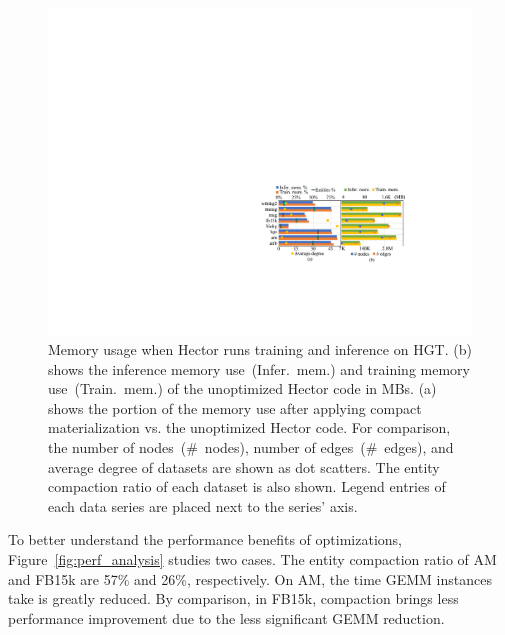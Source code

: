\begin{figure}[!htbp]
\centering
\includegraphics[width=\linewidth]{figures/Hector/DRAMAnalysis_v2.3.pdf}
\caption{\label{fig:dram_analysis} Memory usage when Hector runs training and inference on HGT. (b) shows the inference memory use~(Infer.\ mem.) and training memory use~(Train.\ mem.) of the unoptimized Hector code in MBs. (a) shows the portion of the memory use after applying compact materialization vs. the unoptimized Hector code. For comparison, the number of nodes~(\#\ nodes), number of edges~(\#\ edges), and average degree of datasets are shown as dot scatters. The entity compaction ratio of each dataset is also shown. Legend entries of each data series are placed next to the series' axis.}
\end{figure}


To better understand the performance benefits of optimizations, Figure~\ref{fig:perf_analysis} studies two cases. 
The entity compaction ratio of AM and FB15k are 57\% and 26\%, respectively. On AM, the time GEMM instances take is greatly reduced. By comparison, in FB15k, compaction brings less performance improvement due to the less significant GEMM reduction. 


